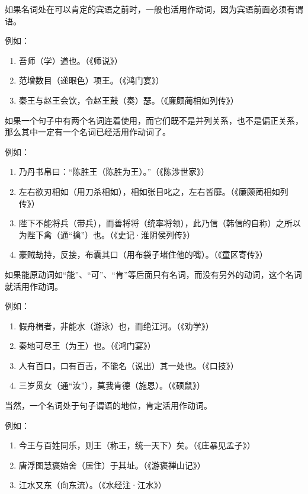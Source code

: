 如果名词处在可以肯定的宾语之前时，一般也活用作动词，因为宾语前面必须有谓语。

例如：

\begin{enumerate}[label=\textcircled{\arabic*}]
	\item 吾师（学）道也。（《师说》）
	\item 范增数目（递眼色）项王。（《鸿门宴》）
	\item 秦王与赵王会饮，令赵王鼓（奏）瑟。（《廉颇蔺相如列传》）
\end{enumerate}

如果一个句子中有两个名词连着使用，而它们既不是并列关系，也不是偏正关系，那么其中一定有一个名词已经活用作动词了。

例如：

\begin{enumerate}[label=\textcircled{\arabic*}]
	\item 乃丹书帛曰：“陈胜王（陈胜为王）。”（《陈涉世家》）
	\item 左右欲刃相如（用刀杀相如），相如张目叱之，左右皆靡。（《廉颇蔺相如列传》）
	\item 陛下不能将兵（带兵），而善将将（统率将领），此乃信（韩信的自称）之所以为陛下禽（通“擒”）也。（《史记·淮阴侯列传》）
	\item 豪贼劫持，反接，布囊其口（用布袋子堵住他的嘴）。（《童区寄传》）
\end{enumerate}

如果能原动词如“能”、“可”、“肯”等后面只有名词，而没有另外的动词，这个名词就活用作动词。

例如：

\begin{enumerate}[label=\textcircled{\arabic*}]
	\item 假舟楫者，非能水（游泳）也，而绝江河。（《劝学》）
	\item 秦地可尽王（为王）也。（《鸿门宴》）
	\item 人有百口，口有百舌，不能名（说出）其一处也。（《口技》）
	\item 三岁贯女（通“汝”），莫我肯德（施恩）。（《硕鼠》）
\end{enumerate}

当然，一个名词处于句子谓语的地位，肯定活用作动词。

例如：

\begin{enumerate}[label=\textcircled{\arabic*}]
	\item 今王与百姓同乐，则王（称王，统一天下）矣。（《庄暴见孟子》）
	\item 唐浮图慧褒始舍（居住）于其址。（《游褒禅山记》）
	\item 江水又东（向东流）。（《水经注·江水》）
\end{enumerate}

